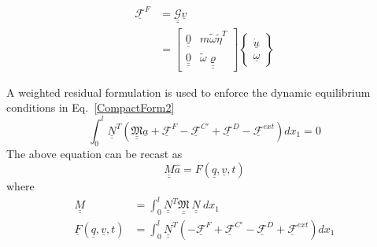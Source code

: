 \documentclass{aiaa-tc}
\newcommand{\tens}[1]{\underline{\underline{#1}}}
\renewcommand{\vec}[1]{\underline{#1}}
\begin{document}
\begin{align}
    \underline{\mathcal{F}}^F &= \underline{\underline{\mathcal{G}}} \underline{v}  \nonumber \\
    \label{CompactForm4}
    &= \begin{bmatrix}
    \underline{\underline{0}} & m \tilde{\omega} \tilde{\eta}^T \\
    \underline{\underline{0}} & \tilde{\omega}  \underline{\underline{\varrho}}
    \end{bmatrix}
    \begin{Bmatrix}
    \dot{\underline{u}} \\
    \underline{\omega}
    \end{Bmatrix} 
\end{align}

A weighted residual formulation is used to enforce the dynamic equilibrium conditions in Eq.~\eqref{CompactForm2}
\begin{equation}
    \label{FEM-1}
    \int_0^l \tens{N}^T (\tens{\mathfrak{M}} \vec{a} + \vec{\mathcal{F}}^F - \vec{\mathcal{F}}^{C\prime} + \vec{\mathcal{F}}^D - \vec{\mathcal{F}}^{ext}) d x_1=0
\end{equation}
The above equation can be recast as
\begin{equation}
    \label{FEM-2}
    \tens{M} \hat{a} = F(\vec{q},\vec{v},t)
\end{equation}
where
\begin{align}
    \label{FEM-3}
    \tens{M} &= \int_0^l \tens{N}^T \tens{\mathfrak{M}}~ \tens{N}~dx_1 \\
    \label{FEM-4}
    \vec{F}(\vec{q},\vec{v},t) &= \int_0^l \tens{N}^T (-\vec{\mathcal{F}}^F + \vec{\mathcal{F}}^{C\prime} - \vec{\mathcal{F}}^D + \vec{\mathcal{F}}^{ext}) d x_1
\end{align}
\end{document}
